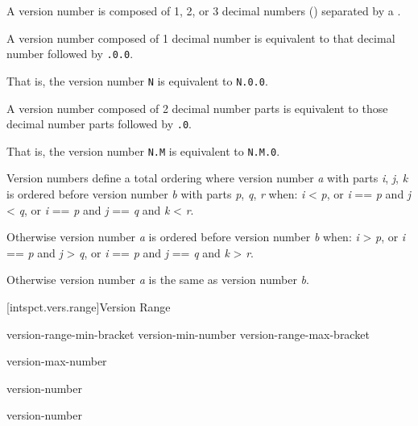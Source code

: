 \pnum
A version number is composed of 1, 2, or 3 decimal numbers
() separated by a  .

\pnum
A version number composed of 1 decimal number is equivalent to that decimal
number followed by \verb|.0.0|.

\begin{note}
That is, the version number \verb|N| is equivalent to \verb|N.0.0|.
\end{note}

\pnum
A version number composed of 2 decimal number parts is equivalent to those
decimal number parts followed by \verb|.0|.

\begin{note}
That is, the version number \verb|N.M| is equivalent to \verb|N.M.0|.
\end{note}

\pnum
Version numbers define a total ordering where version number \emph{a} with parts
\emph{i}, \emph{j}, \emph{k} is ordered before version number \emph{b} with
parts \emph{p}, \emph{q}, \emph{r} when: \emph{i} < \emph{p}, or \emph{i} ==
\emph{p} and \emph{j} < \emph{q}, or \emph{i} == \emph{p} and \emph{j} ==
\emph{q} and \emph{k} < \emph{r}.

\pnum
Otherwise version number \emph{a} is ordered before version number \emph{b}
when: \emph{i} > \emph{p}, or \emph{i} == \emph{p} and \emph{j} > \emph{q}, or
\emph{i} == \emph{p} and \emph{j} == \emph{q} and \emph{k} > \emph{r}.

\pnum
Otherwise version number \emph{a} is the same as version number \emph{b}.

[intspct.vers.range]{Version Range}

\pnum
\begin{ncbnf}

\br
	version-range-min-bracket
	version-min-number 
	version-range-max-bracket

\br
	  version-max-number

\br
	version-number

\br
	version-number

\br
	\br
	 
	 

\br
	\br
	 
	 

\end{ncbnf}

